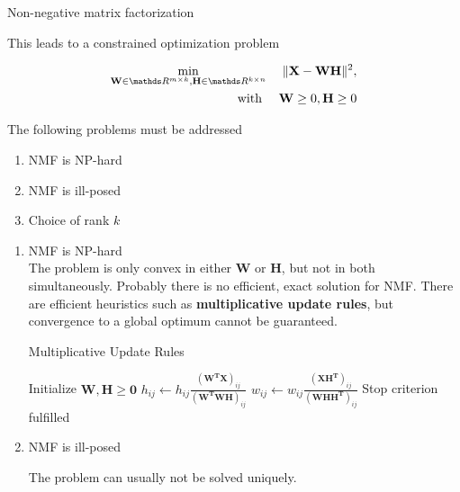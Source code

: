 \begin{vbframe}{Non-negative matrix factorization}

This leads to a constrained optimization problem 

\begin{eqnarray*}
 \min_{\mathbf{W}\in \R^{m \times k}, \mathbf{H}\in \R^{k \times n}} & & \|\mathbf{X} - \mathbf{WH}\|^2, \\
\text{with } & & \mathbf{W} \ge 0, \mathbf{H} \ge 0
\end{eqnarray*}

The following problems must be addressed

\begin{enumerate}
\item NMF is NP-hard
\item NMF is ill-posed
\item Choice of rank $k$
\end{enumerate}

\framebreak

\begin{enumerate}
\item NMF is NP-hard \\

The problem is only convex in either $\mathbf{W}$ or $\mathbf{H}$, but not in both simultaneously. Probably there is no efficient, exact solution for NMF. There are efficient heuristics such as \textbf{multiplicative update rules}, but convergence to a global optimum cannot be guaranteed.

\begin{algorithm}[H]
  \caption{Multiplicative Update Rules}
  \begin{algorithmic}[1]
  \State Initialize $\mathbf{W}, \mathbf{H} \ge \mathbf{0}$
  \Repeat
    \State $h_{ij} \leftarrow h_{ij} \frac{(\mathbf{W^TX})_{ij}}{(\mathbf{W^TWH})_{ij}}$
    \State $w_{ij} \leftarrow w_{ij} \frac{(\mathbf{XH^T})_{ij}}{(\mathbf{WHH^T})_{ij}}$
  \Until Stop criterion fulfilled
  \end{algorithmic}
\end{algorithm}

\framebreak

\item NMF is ill-posed \\

\lz

The problem can usually not be solved uniquely.


\end{enumerate}
\end{vbframe}
